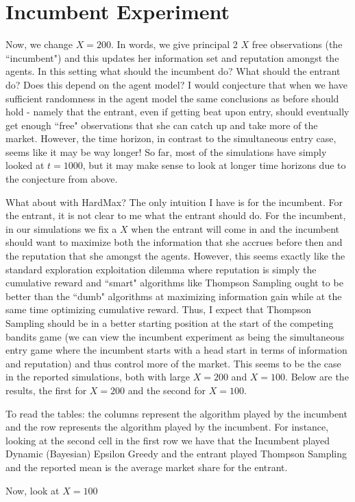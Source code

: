 \documentclass[11pt,letterpaper]{article}
\begin{document}
\section*{Incumbent Experiment}
Now, we change $X = 200$. In words, we give principal 2 $X$ free observations (the ``incumbent") and this updates her information set and reputation amongst the agents. In this setting what should the incumbent do? What should the entrant do? Does this depend on the agent model? I would conjecture that when we have sufficient randomness in the agent model the same conclusions as before should hold - namely that the entrant, even if getting beat upon entry, should eventually get enough ``free" observations that she can catch up and take more of the market. However, the time horizon, in contrast to the simultaneous entry case, seems like it may be way longer! So far, most of the simulations have simply looked at $t = 1000$, but it may make sense to look at longer time horizons due to the conjecture from above. \\
\vspace{0.25cm}

What about with HardMax? The only intuition I have is for the incumbent. For the entrant, it is not clear to me what the entrant should do. For the incumbent, in our simulations we fix a $X$ when the entrant will come in and the incumbent should want to maximize both the information that she accrues before then and the reputation that she amongst the agents. However, this seems exactly like the standard exploration exploitation dilemma where reputation is simply the cumulative reward and ``smart" algorithms like Thompson Sampling ought to be better than the ``dumb" algorithms at maximizing information gain while at the same time optimizing cumulative reward. Thus, I expect that Thompson Sampling should be in a better starting position at the start of the competing bandits game (we can view the incumbent experiment as being the simultaneous entry game where the incumbent starts with a head start in terms of information and reputation) and thus control more of the market. This seems to be the case in the reported simulations, both with large $X = 200$ and $X = 100$. Below are the results, the first for $X = 200$ and the second for $X = 100$.

To read the tables: the columns represent the algorithm played by the incumbent and the row represents the algorithm played by the incumbent. For instance, looking at the second cell in the first row we have that the Incumbent played Dynamic (Bayesian) Epsilon Greedy and the entrant played Thompson Sampling and the reported mean is the average market share for the entrant.



Now, look at $X = 100$


\end{document}
